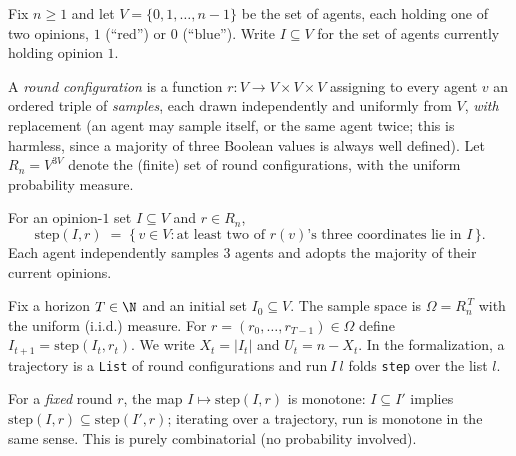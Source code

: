 Fix $n \ge 1$ and let $V = \{0,1,\dots,n-1\}$ be the set of agents, each
holding one of two opinions, $1$ (``red'') or $0$ (``blue''). Write
$I \subseteq V$ for the set of agents currently holding opinion $1$.

\begin{definition}\label{def:round}
  \leanok
  A \emph{round configuration} is a function $r \colon V \to V \times V
  \times V$ assigning to every agent $v$ an ordered triple of \emph{samples},
  each drawn independently and uniformly from $V$, \emph{with} replacement
  (an agent may sample itself, or the same agent twice; this is harmless, since a
  majority of three Boolean values is always well defined). Let
  $R_n = V^{3V}$ denote the (finite) set of round configurations, with the
  uniform probability measure.
\end{definition}

\begin{definition}\label{def:binary-step}
  \leanok
  For an opinion-$1$ set $I \subseteq V$ and $r \in R_n$,
  \[
    \mathrm{step}(I,r) \;=\; \{\, v \in V : \text{at least two of } r(v)\text{'s three
    coordinates lie in } I \,\}.
  \]
  Each agent independently samples $3$ agents and adopts the majority of
  their current opinions.
\end{definition}

\begin{definition}[Process]\label{def:process}
  \leanok
  Fix a horizon $T \in \N$ and an initial set $I_0 \subseteq V$. The sample
  space is $\Omega = R_n^{\,T}$ with the uniform (i.i.d.) measure. For
  $r = (r_0,\dots,r_{T-1}) \in \Omega$ define $I_{t+1} =
  \mathrm{step}(I_t, r_t)$. We write $X_t = |I_t|$ and $U_t = n - X_t$. In
  the formalization, a trajectory is a \texttt{List} of round configurations
  and $\mathrm{run}\ I\ l$ folds \texttt{step} over the list $l$.
\end{definition}

\begin{lemma}\label{lem:mono}
  \leanok
  For a \emph{fixed} round $r$, the map $I \mapsto \mathrm{step}(I,r)$ is
  monotone: $I \subseteq I'$ implies $\mathrm{step}(I,r) \subseteq
  \mathrm{step}(I',r)$; iterating over a trajectory, $\mathrm{run}$ is
  monotone in the same sense. This is purely combinatorial (no probability
  involved).
\end{lemma}

